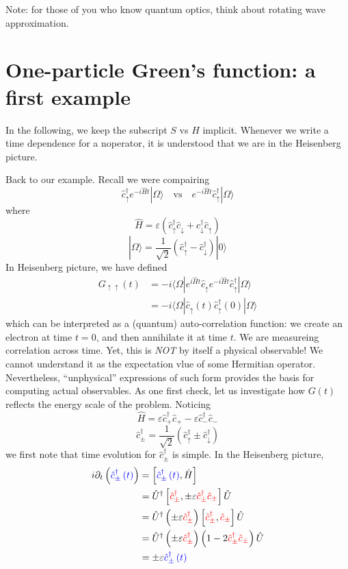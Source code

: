 Note: for those of you who know quantum optics, think about rotating wave approximation.

\section{One-particle Green's function: a first example}

In the following, we keep the subscript $S$ vs $H$ implicit. Whenever we write a time dependence for a noperator, it is understood that we are in the Heisenberg picture.

Back to our example. Recall we were compairing
\[ \hat{c}_{\uparrow}^{\dagger}e^{-i\hat{H}t}|\Omega \rangle \quad \mathrm{vs}\quad e^{-i\hat{H}t}\hat{c}_{\uparrow}^{\dagger}|\Omega \rangle \]
where
\[ \hat{H}=\varepsilon \left( \hat{c}_{\uparrow}^{\dagger}\hat{c}_{\downarrow}+\hat{c}_{\downarrow}^{\dagger}\hat{c}_{\uparrow} \right) \]
\[ |\Omega \rangle =\frac{1}{\sqrt{2}}\left( \hat{c}_{\uparrow}^{\dagger}-\hat{c}_{\downarrow}^{\dagger} \right) |0\rangle \]
In Heisenberg picture, we have defined
\begin{align*}
    G_{\uparrow \uparrow}\left( t \right) &=-i\langle \Omega |e^{i\hat{H}t}\hat{c}_{\uparrow}e^{-i\hat{H}t}\hat{c}_{\uparrow}^{\dagger}|\Omega \rangle \\
    &=-i\langle \Omega |\hat{c}_{\uparrow}\left( t \right) \hat{c}_{\uparrow}^{\dagger}\left( 0 \right) |\Omega \rangle
\end{align*}
which can be interpreted as a (quantum) auto-correlation function: we create an electron at time $t=0$, and then annihilate it at time $t$. We are measureing correlation across time. Yet, this is \emph{NOT} by itself a physical observable! We cannot understand it as the expectation vlue of some Hermitian operator. Nevertheless, ``unphysical'' expressions of such form provides the basis for computing actual observables. As one first check, let us investigate how $G(t)$ reflects the energy scale of the problem. Noticing
\[ \hat{H}=\varepsilon \hat{c}_{+}^{\dagger}\hat{c}_+-\varepsilon \hat{c}_{-}^{\dagger}\hat{c}_-\]
\[ \hat{c}_{\pm}^{\dagger}=\frac{1}{\sqrt{2}}\left( \hat{c}_{\uparrow}^{\dagger}\pm \hat{c}_{\downarrow}^{\dagger} \right) \]
we first note that time evolution for $\hat{c}_{\pm}^\dagger$ is simple. In the Heisenberg picture,
\begin{align*}
    i\partial _t\left( {\color{blue} \hat{c}_{\pm}^{\dagger}\left( t \right) } \right) &=\left[ {\color{blue} \hat{c}_{\pm}^{\dagger}\left( t \right) },\hat{H} \right] \\
    &=\hat{U}^{\dagger}\left[ {\color{red} \hat{c}_{\pm}^{\dagger}},\pm \varepsilon {\color{red} \hat{c}_{\pm}^{\dagger}\hat{c}_{\pm}} \right] \hat{U}\\
    &=\hat{U}^{\dagger}\left( \pm \varepsilon {\color{red} \hat{c}_{\pm}^{\dagger}} \right) \left[ {\color{red} \hat{c}_{\pm}^{\dagger}},{\color{red} \hat{c}_{\pm}} \right] \hat{U}\\
    &=\hat{U}^{\dagger}\left( \pm \varepsilon {\color{red} \hat{c}_{\pm}^{\dagger}} \right) \left( 1-2{\color{red} \hat{c}_{\pm}^{\dagger}\hat{c}_{\pm}} \right) \hat{U}\\
    &=\pm \varepsilon {\color{blue} \hat{c}_{\pm}^{\dagger}\left( t \right) }
\end{align*}
